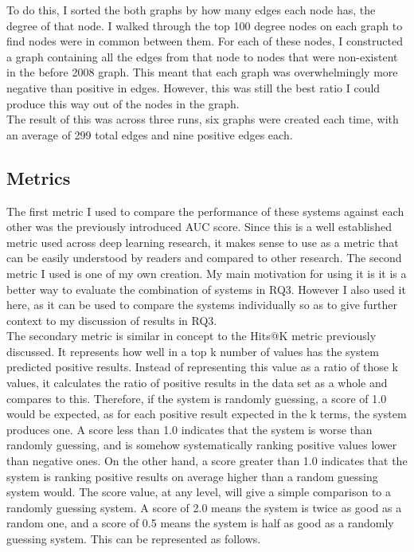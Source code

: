 \documentclass{l4proj}
\begin{document}
To do this, I sorted the both graphs by how many edges each node has, the degree of that node. I walked through the top 100 degree nodes on each graph to find nodes were in common between them. For each of these nodes, I constructed a graph containing all the edges from that node to nodes that were non-existent in the before 2008 graph. This meant that each graph was overwhelmingly more negative than positive in edges. However, this was still the best ratio I could produce this way out of the nodes in the graph. \\ 

The result of this was across three runs, six graphs were created each time, with an average of 299 total edges and nine positive edges each. \\

\subsection{Metrics}

The first metric I used to compare the performance of these systems against each other was the previously introduced AUC score. Since this is a well established metric used across deep learning research, it makes sense to use as a metric that can be easily understood by readers and compared to other research. The second metric I used is one of my own creation. My main motivation for using it is it is a better way to evaluate the combination of systems in RQ3. However I also used it here, as it can be used to compare the systems individually so as to give further context to my discussion of results in RQ3. \\ 

The secondary metric is similar in concept to the Hits@K metric previously discussed. It represents how well in a top k number of values has the system predicted positive results. Instead of representing this value as a ratio of those k values, it calculates the ratio of positive results in the data set as a whole and compares to this. Therefore, if the system is randomly guessing, a score of 1.0 would be expected, as for each positive result expected in the k terms, the system produces one. A score less than 1.0 indicates that the system is worse than randomly guessing, and is somehow systematically ranking positive values lower than negative ones. On the other hand, a score greater than 1.0 indicates that the system is ranking positive results on average higher than a random guessing system would. The score value, at any level, will give a simple comparison to a randomly guessing system. A score of 2.0 means the system is twice as good as a random one, and a score of 0.5 means the system is half as good as a randomly guessing system. This can be represented as follows.\\
\end{document}
